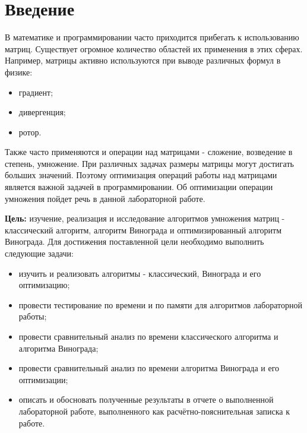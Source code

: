 \chapter*{Введение}

В математике и программировании часто приходится прибегать к использованию матриц. Существует огромное количество областей их применения в этих сферах. Например, матрицы активно используются при выводе различных формул в физике:

\begin{itemize}
    \item градиент;
    \item дивергенция;
    \item ротор.
\end{itemize}

Также часто применяются и операции над матрицами - сложение, возведение в степень, умножение. При различных задачах размеры матрицы могут достигать больших значений. Поэтому оптимизация операций работы над матрицами является важной задачей в программировании. Об оптимизации операции умножения пойдет речь в данной лабораторной работе.


\textbf{Цель:} изучение, реализация и исследование алгоритмов умножения матриц - классический алгоритм, алгоритм Винограда и оптимизированный алгоритм Винограда. 
Для достижения поставленной цели необходимо выполнить следующие задачи:
\begin{itemize}
	\item изучить и реализовать алгоритмы - классический, Винограда и его оптимизацию;
    \item провести тестирование по времени и по памяти для алгоритмов лабораторной работы;
    \item провести сравнительный анализ по времени классического алгоритма и алгоритма Винограда;
    \item провести сравнительный анализ по времени алгоритма Винограда и его оптимизации;
	\item описать и обосновать полученные результаты в отчете о выполненной лабораторной работе, выполненного как расчётно-пояснительная записка к работе.
\end{itemize}
